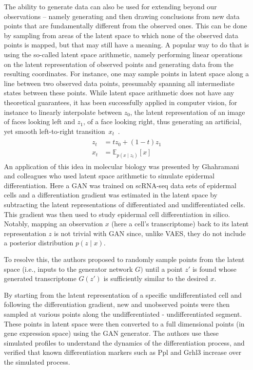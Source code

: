 The ability to generate data can also be used for extending beyond our observations -- namely generating and then drawing conclusions from new data points that are fundamentally different from the observed ones. This can be done by sampling from areas of the latent space to which none of the observed data points is mapped, but that may still have a meaning. A popular way to do that is using the so-called latent space arithmetic, namely performing linear operations on the latent representation of observed points and generating data from the resulting coordinates. For instance, one may sample points in latent space along a line between two observed data points, presumably spanning all intermediate states between these points. While latent space arithmetic does not have any theoretical guarantees, it has been successfully applied in computer vision, for instance to linearly interpolate between $z_0$, the latent representation of an image of faces looking left and $z_1$, of a face looking right, thus generating an artificial, yet smooth left-to-right transition~$x_t$~\cite{Radford2016}. 
\begin{align}
\begin{split}
    z_t &= tz_0 + (1-t)z_1 \\
    x_t &= \mathbb{E}_{p(x \mid z_t)}[x]
\end{split}
\end{align}
An application of this idea in molecular biology was presented by Ghahramani and colleagues \cite{Ghahramani2018} who used latent space arithmetic to simulate epidermal differentiation. Here a GAN was trained on scRNA-seq data sets of epidermal cells and a differentiation gradient was estimated in the latent space by subtracting the latent representations of differentiated and undifferentiated cells. This gradient was then used to study epidermal cell differentiation in silico. Notably, mapping an observation $x$ (here a cell's transcriptome) back to its latent representation $z$ is not trivial with GAN since, unlike VAES, they do not include a posterior distribution $p(z \mid x)$. 

To resolve this, the authors proposed to randomly sample points from the latent space (i.e., inputs to the generator network $G)$ until a point $z'$ is found whose generated transcriptome $G(z')$ is sufficiently similar to the desired $x$.


By starting from the latent representation of a specific undifferentiated cell and following the differentiation gradient, new and unobserved points were then sampled at various points along the undifferentiated - undifferentiated segment. These points in latent space were then converted to a full dimensional points (in gene expression space) using the GAN generator. The authors use these simulated profiles to understand the dynamics of the differentiation process, and verified that known differentiation markers such as Ppl and Grhl3 increase over the simulated process. 


